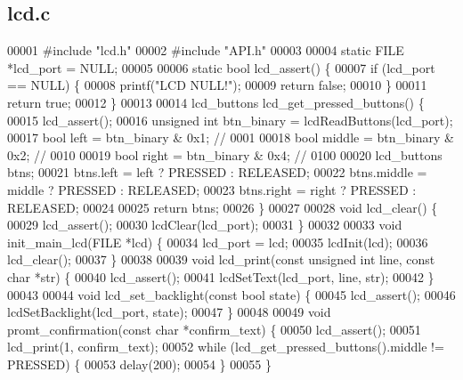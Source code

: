 \subsection{lcd.\+c}
\label{lcd_8c_source}

\begin{DoxyCode}
00001 \textcolor{preprocessor}{#include "lcd.h"}
00002 \textcolor{preprocessor}{#include "API.h"}
00003 
00004 \textcolor{keyword}{static} FILE *lcd\_port = NULL;
00005 
00006 \textcolor{keyword}{static} \textcolor{keywordtype}{bool} lcd\_assert() \{
00007   \textcolor{keywordflow}{if} (lcd\_port == NULL) \{
00008     printf(\textcolor{stringliteral}{"LCD NULL!"});
00009     \textcolor{keywordflow}{return} \textcolor{keyword}{false};
00010   \}
00011   \textcolor{keywordflow}{return} \textcolor{keyword}{true};
00012 \}
00013 
00014 lcd_buttons lcd_get_pressed_buttons() \{
00015   lcd\_assert();
00016   \textcolor{keywordtype}{unsigned} \textcolor{keywordtype}{int} btn\_binary = lcdReadButtons(lcd\_port);
00017   \textcolor{keywordtype}{bool} left = btn\_binary & 0x1;   \textcolor{comment}{// 0001}
00018   \textcolor{keywordtype}{bool} middle = btn\_binary & 0x2; \textcolor{comment}{// 0010}
00019   \textcolor{keywordtype}{bool} right = btn\_binary & 0x4;  \textcolor{comment}{// 0100}
00020   lcd_buttons btns;
00021   btns.left = left ? PRESSED : RELEASED;
00022   btns.middle = middle ? PRESSED : RELEASED;
00023   btns.right = right ? PRESSED : RELEASED;
00024 
00025   \textcolor{keywordflow}{return} btns;
00026 \}
00027 
00028 \textcolor{keywordtype}{void} lcd_clear() \{
00029   lcd\_assert();
00030   lcdClear(lcd\_port);
00031 \}
00032 
00033 \textcolor{keywordtype}{void} init_main_lcd(FILE *lcd) \{
00034   lcd\_port = lcd;
00035   lcdInit(lcd);
00036   lcd_clear();
00037 \}
00038 
00039 \textcolor{keywordtype}{void} lcd_print(\textcolor{keyword}{const} \textcolor{keywordtype}{unsigned} \textcolor{keywordtype}{int} line, \textcolor{keyword}{const} \textcolor{keywordtype}{char} *str) \{
00040   lcd\_assert();
00041   lcdSetText(lcd\_port, line, str);
00042 \}
00043 
00044 \textcolor{keywordtype}{void} lcd_set_backlight(\textcolor{keyword}{const} \textcolor{keywordtype}{bool} state) \{
00045   lcd\_assert();
00046   lcdSetBacklight(lcd\_port, state);
00047 \}
00048 
00049 \textcolor{keywordtype}{void} promt_confirmation(\textcolor{keyword}{const} \textcolor{keywordtype}{char} *confirm\_text) \{
00050   lcd\_assert();
00051   lcd_print(1, confirm\_text);
00052   \textcolor{keywordflow}{while} (lcd_get_pressed_buttons().middle != PRESSED) \{
00053     delay(200);
00054   \}
00055 \}
\end{DoxyCode}
